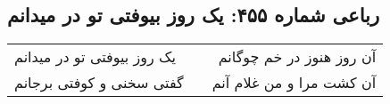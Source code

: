 \begin{center}
\section*{رباعی شماره ۴۵۵: یک روز بیوفتی تو در میدانم}
\label{sec:sh455}
\begin{longtable}{l p{0.5cm} r}
یک روز بیوفتی تو در میدانم
&&
آن روز هنوز در خم چوگانم
\\
گفتی سخنی و کوفتی برجانم
&&
آن کشت مرا و من غلام آنم
\\
\end{longtable}
\end{center}
